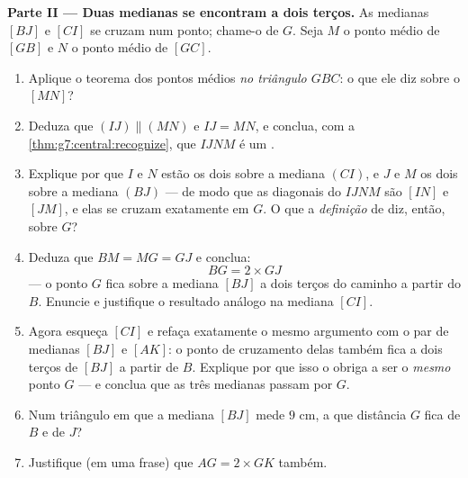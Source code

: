 \begin{problem}
\medskip
\noindent\textbf{Parte II --- Duas medianas se encontram a dois
terços.}
As medianas $[BJ]$ e $[CI]$ se cruzam num ponto; chame-o de $G$. Seja
$M$ o ponto médio de $[GB]$ e $N$ o ponto médio de $[GC]$.
\begin{enumerate}[resume]
  \item Aplique o teorema dos pontos médios \emph{no triângulo $GBC$}:
        o que ele diz sobre o  $[MN]$?
  \item Deduza que $(IJ) \parallel (MN)$ e $IJ = MN$, e conclua, com a
        \cref{thm:g7:central:recognize}, que $IJNM$ é um
        .
  \item Explique por que $I$ e $N$ estão os dois sobre a mediana
        $(CI)$, e $J$ e $M$ os dois sobre a mediana $(BJ)$ --- de modo
        que as diagonais do  $IJNM$ são $[IN]$ e $[JM]$,
        e elas se cruzam exatamente em $G$. O que a \emph{definição} de
         diz, então, sobre $G$?
  \item Deduza que $BM = MG = GJ$ e conclua:
        \[
        BG = 2 \times GJ
        \]
        --- o ponto $G$ fica sobre a mediana $[BJ]$ a dois terços do
        caminho a partir do  $B$. Enuncie e justifique o
        resultado análogo na mediana $[CI]$.
  \item Agora esqueça $[CI]$ e refaça exatamente o mesmo argumento com
        o par de medianas $[BJ]$ e $[AK]$: o ponto de cruzamento delas
        também fica a dois terços de $[BJ]$ a partir de $B$. Explique
        por que isso o obriga a ser o \emph{mesmo} ponto $G$ --- e
        conclua que as três medianas passam por $G$.
  \item Num triângulo em que a mediana $[BJ]$ mede $9$ cm, a que
        distância $G$ fica de $B$ e de $J$?
  \item Justifique (em uma frase) que $AG = 2 \times GK$ também.
\end{enumerate}


\end{problem}
